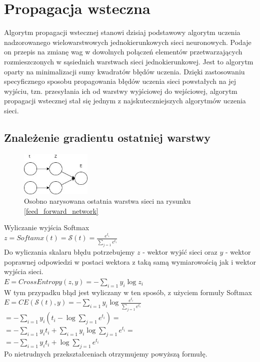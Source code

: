 \documentclass{article}
\begin{document}
\section{Propagacja wsteczna}
Algorytm propagacji wstecznej stanowi dzisiaj podstawowy algorytm uczenia nadzorowanego wielowarstwowych jednokierunkowych sieci neuronowych. Podaje on przepis na zmianę wag w dowolnych połączeń elementów przetwarzających rozmieszczonych w sąsiednich warstwach sieci jednokierunkowej. Jest to algorytm oparty na minimalizacji sumy kwadratów błędów uczenia. Dzięki zastosowaniu specyficznego sposobu propagowania błędów uczenia sieci powstałych na jej wyjściu, tzn. przesyłania ich od warstwy wyjściowej do wejściowej, algorytm propagacji wstecznej stał się jednym z najskuteczniejszych algorytmów uczenia sieci. \cite{nn_jozef}

\subsection{Znależenie gradientu ostatniej warstwy}
\begin{figure}[H]
	\centering
	\includegraphics[width=0.3\textwidth,keepaspectratio=true]{feed_forward_error}
	\caption{Osobno narysowana ostatnia warstwa sieci na rysunku \ref{feed_forward_network}}
	\label{feed_forward_error}
\end{figure}

Wyliczanie wyjścia Softmax\\
$z = Softamx(t) = \mathcal{S}(t)= \frac{e^{t_i}}{\sum_{j=1}e^{t_i}}$ \\

Do wyliczania skalaru błędu potrzebujemy $z$ - wektor wyjść sieci oraz $y$ - wektor poprawnej odpowiedzi w postaci wektora z taką samą wymiarowością jak i wektor wyjścia sieci.\\
$E = CrossEntropy(z, y) = -\sum_{i=1}y_i\log z_i$\\

W tym przypadku błąd jest wyliczany w ten sposób, z użyciem formuły Softmax\\
$E = CE(\mathcal{S}(t),y)=-\sum_{i=1}y_i\log\frac{e^{t_i}}{\sum_{j=1}e^{t_i}}$\\
$= -\sum_{i=1}y_i(t_i-\log \sum_{j=1}e^{t_i}) =$\\
$= -\sum_{i=1}y_it_i + \sum_{i=1}y_i\log\sum_{j=1}e^{t_i} =$\\
$= -\sum_{i=1}y_it_i + \log\sum_{j=1}e^{t_i}$\\
Po nietrudnych przekształceniach otrzymujemy powyższą formułę.\\
\end{document}
